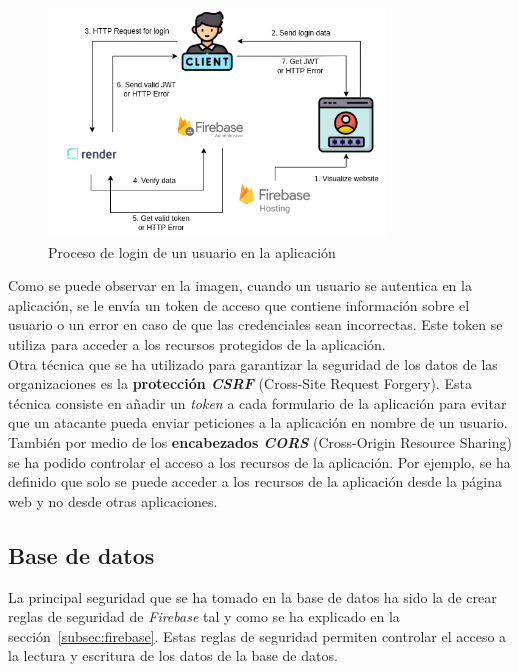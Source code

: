 \begin{figure}[H]
    \centering
    \includegraphics[width=0.8\textwidth]{imgs/login-diagrama.png}
    \caption{Proceso de login de un usuario en la aplicación}
    \label{fig:login}
\end{figure}

Como se puede observar en la imagen, cuando un usuario se autentica en la aplicación, se le envía un token de acceso
que contiene información sobre el usuario o un error en caso de que las credenciales sean incorrectas. Este token
se utiliza para acceder a los recursos protegidos de la aplicación. \\

Otra técnica que se ha utilizado para garantizar la seguridad de los datos de las organizaciones es la \textbf{protección \textit{CSRF}} (Cross-Site Request Forgery).
Esta técnica consiste en añadir un \textit{token} a cada formulario de la aplicación para evitar que un atacante pueda enviar
peticiones a la aplicación en nombre de un usuario. También por medio de los \textbf{encabezados \textit{CORS}} (Cross-Origin Resource Sharing) se ha
podido controlar el acceso a los recursos de la aplicación. Por ejemplo, se ha definido que solo se puede acceder a los
recursos de la aplicación desde la página web y no desde otras aplicaciones.

\newpage

\subsection{Base de datos}\label{subsec:base-de-datos}

La principal seguridad que se ha tomado en la base de datos ha sido la de crear reglas de seguridad de \textit{Firebase} tal
y como se ha explicado en la sección~\ref{subsec:firebase}. Estas reglas de seguridad permiten controlar el acceso a la
lectura y escritura de los datos de la base de datos. \\

